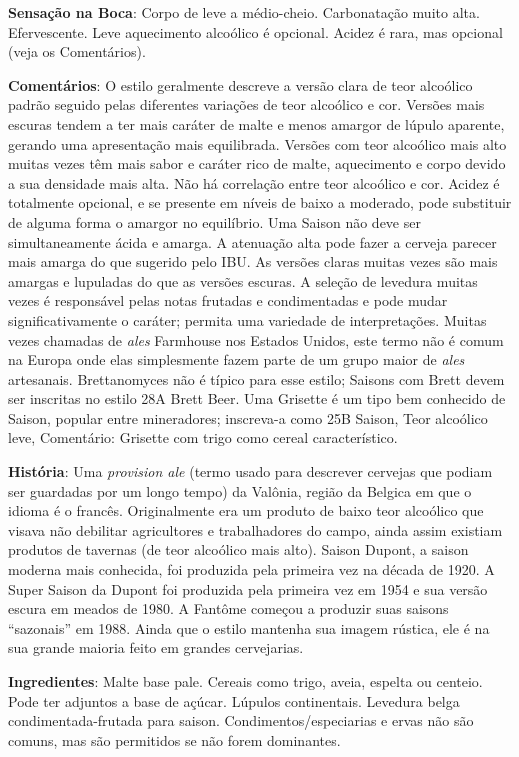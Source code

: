 \textbf{Sensação na Boca}: Corpo de leve a médio-cheio. Carbonatação muito alta. Efervescente. Leve aquecimento alcoólico é opcional. Acidez é rara, mas opcional (veja os Comentários).

\textbf{Comentários}: O estilo geralmente descreve a versão clara de teor alcoólico padrão seguido pelas diferentes variações de teor alcoólico e cor. Versões mais escuras tendem a ter mais caráter de malte e menos amargor de lúpulo aparente, gerando uma apresentação mais equilibrada. Versões com teor alcoólico mais alto muitas vezes têm mais sabor e caráter rico de malte, aquecimento e corpo devido a sua densidade mais alta. Não há correlação entre teor alcoólico e cor.
Acidez é totalmente opcional, e se presente em níveis de baixo a moderado, pode substituir de alguma forma o amargor no equilíbrio. Uma Saison não deve ser simultaneamente ácida e amarga. A atenuação alta pode fazer a cerveja parecer mais amarga do que sugerido pelo IBU. As versões claras muitas vezes são mais amargas e lupuladas do que as versões escuras. A seleção de levedura muitas vezes é responsável pelas notas frutadas e condimentadas e pode mudar significativamente o caráter; permita uma variedade de interpretações.
Muitas vezes chamadas de \textit{ales} Farmhouse nos Estados Unidos, este termo não é comum na Europa onde elas simplesmente fazem parte de um grupo maior de \textit{ales} artesanais. Brettanomyces não é típico para esse estilo; Saisons com Brett devem ser inscritas no estilo 28A Brett Beer. Uma Grisette é um tipo bem conhecido de Saison, popular entre mineradores; inscreva-a como 25B Saison, Teor alcoólico leve, Comentário: Grisette com trigo como cereal característico.

\textbf{História}: Uma \textit{provision ale} (termo usado para descrever cervejas que podiam ser guardadas por um longo tempo) da Valônia, região da Belgica em que o idioma é o francês. Originalmente era um produto de baixo teor alcoólico que visava não debilitar agricultores e trabalhadores do campo, ainda assim existiam produtos de tavernas (de teor alcoólico mais alto). Saison Dupont, a saison moderna mais conhecida, foi produzida pela primeira vez na década de 1920. A Super Saison da Dupont foi produzida pela primeira vez em 1954 e sua versão escura em meados de 1980. A Fantôme começou a produzir suas saisons “sazonais” em 1988. Ainda que o estilo mantenha sua imagem rústica, ele é na sua grande maioria feito em grandes cervejarias.

\textbf{Ingredientes}: Malte base pale. Cereais como trigo, aveia, espelta ou centeio. Pode ter adjuntos a base de açúcar. Lúpulos continentais. Levedura belga condimentada-frutada para saison. Condimentos/especiarias e ervas não são comuns, mas são permitidos se não forem dominantes.

